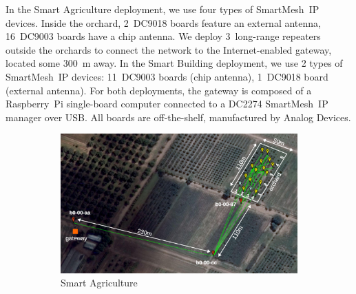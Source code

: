\documentclass{elsarticle}
\newcommand{\smip}                {SmartMesh~IP\xspace}
\newcommand{\building}            {Smart Building\xspace}
\newcommand{\agri}                {Smart Agriculture\xspace}
\begin{document}

In the \agri deployment, we use four types of \smip devices.
Inside the orchard, 2~DC9018 boards feature an external antenna, 16~DC9003 boards have a chip antenna.
We deploy 3~long-range repeaters outside the orchards to connect the network to the Internet-enabled gateway, located some 300~m away.
In the \building deployment, we use 2 types of \smip devices: 11~DC9003 boards (chip antenna), 1~DC9018 board (external antenna).
For both deployments, the gateway is composed of a Raspberry~Pi single-board computer connected to a DC2274 \smip manager over USB.
All boards are off-the-shelf, manufactured by Analog Devices.

\begin{figure}
    \centering
    \begin{subfigure}[h]{0.70\textwidth}
        \includegraphics[width=\textwidth]{map_annotated}
        \caption{\agri}
        \label{fig:agri_map}
    \end{subfigure}
    \begin{subfigure}[h]{0.27\textwidth}  

\end{subfigure}
\end{figure}
\end{document}
